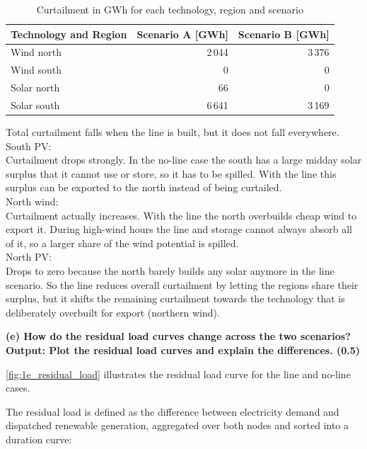 \begin{table}[!htbp]
    \centering
    \begin{tabular}{l r r}
        \hline
        Technology and Region & Scenario A [GWh] & Scenario B [GWh] \\
        \hline
        Wind north   & 2\,044 & 3\,376  \\
        Wind south   & 0      & 0       \\
        Solar north  & 66     & 0       \\
        Solar south  & 6\,641 & 3\,169  \\
        \hline
    \end{tabular}
    \caption{Curtailment in GWh for each technology, region and scenario}
    \label{tab:1d_curtailment_quantified}
\end{table}

Total curtailment falls when the line is built, but it does not fall everywhere. \\
South PV:   \\ Curtailment drops strongly.
In the no-line case the south has a large midday solar surplus that it cannot use or store, so it has to be spilled.
With the line this surplus can be exported to the north instead of being curtailed. \\
North wind: \\ Curtailment actually increases.
With the line the north overbuilds cheap wind to export it.
During high-wind hours the line and storage cannot always absorb all of it, so a larger share of the wind potential is spilled.\\
North PV:   \\ Drops to zero because the north barely builds any solar anymore in the line scenario.
So the line reduces overall curtailment by letting the regions share their surplus, but it shifts the remaining curtailment towards the technology that is deliberately overbuilt for export (northern wind).

\textbf{
    (e) How do the residual load curves change across the two scenarios? \\
    Output: Plot the residual load curves and explain the differences. (0.5)
    }

\autoref{fig:1e_residual_load} illustrates the residual load curve for the line and no-line cases.

The residual load is defined as the difference between electricity demand and dispatched renewable generation, aggregated over both nodes and sorted into a duration curve:

